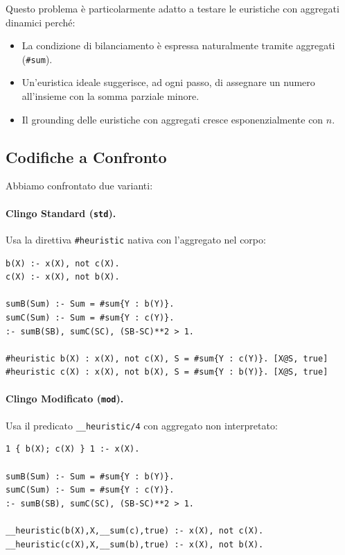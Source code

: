 \documentclass[a4paper,12pt,twoside,openright]{report}
\begin{document}
Questo problema \`{e} particolarmente adatto a testare le euristiche con aggregati dinamici perch\'{e}:
\begin{itemize}
    \item La condizione di bilanciamento \`{e} espressa naturalmente tramite aggregati (\texttt{\#sum}).
    \item Un'euristica ideale suggerisce, ad ogni passo, di assegnare un numero all'insieme con la somma parziale minore.
    \item Il grounding delle euristiche con aggregati cresce esponenzialmente con $n$.
\end{itemize}

\subsection{Codifiche a Confronto}

Abbiamo confrontato due varianti:

\paragraph{Clingo Standard (\texttt{std}).}
Usa la direttiva \texttt{\#heuristic} nativa con l'aggregato nel corpo:
\begin{lstlisting}[caption={Codifica standard con euristica ground (file \texttt{BSP\_gc.lp})}]
b(X) :- x(X), not c(X).
c(X) :- x(X), not b(X).

sumB(Sum) :- Sum = #sum{Y : b(Y)}.
sumC(Sum) :- Sum = #sum{Y : c(Y)}.
:- sumB(SB), sumC(SC), (SB-SC)**2 > 1.

#heuristic b(X) : x(X), not c(X), S = #sum{Y : c(Y)}. [X@S, true]
#heuristic c(X) : x(X), not b(X), S = #sum{Y : b(Y)}. [X@S, true]
\end{lstlisting}

\paragraph{Clingo Modificato (\texttt{mod}).}
Usa il predicato \texttt{\_\_heuristic/4} con aggregato non interpretato:
\begin{lstlisting}[caption={Codifica con aggregati dinamici (file \texttt{\_2\_non\_ground.lp})}]
1 { b(X); c(X) } 1 :- x(X).

sumB(Sum) :- Sum = #sum{Y : b(Y)}.
sumC(Sum) :- Sum = #sum{Y : c(Y)}.
:- sumB(SB), sumC(SC), (SB-SC)**2 > 1.

__heuristic(b(X),X,__sum(c),true) :- x(X), not c(X).
__heuristic(c(X),X,__sum(b),true) :- x(X), not b(X).
\end{lstlisting}
\end{document}
